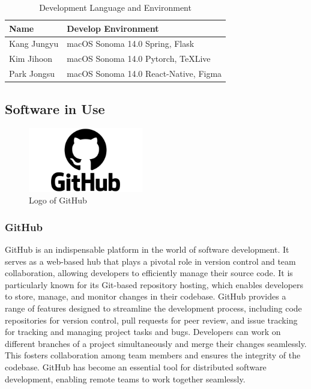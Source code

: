 \documentclass[conference]{IEEEtran}
\begin{document}
    \begin{table}[htbp]
        \caption{Development Language and Environment}
        \centering
        \begin{xtabular}{|p{2cm}|p{4cm}|}
        \hline
        Name & Develop Environment\\
        \hline
        Kang Jungyu & 
        macOS Sonoma 14.0 \hfill \break Spring, Flask\\
        \hline
        Kim Jihoon & 
        macOS Sonoma 14.0 \hfill \break Pytorch, TeXLive\\
        \hline
        Park Jongsu & 
        macOS Sonoma 14.0 \hfill \break React-Native, Figma\\
        \hline
        \end{xtabular}
    \end{table}

    \newpage
    \subsection{Software in Use}
    
        \begin{figure}[htbp]
        \centerline{\includegraphics[width=5cm]{Images/logo/github.png}}
        \label{fig}
        \caption{Logo of GitHub}
        \end{figure}
        \subsubsection{GitHub}
        GitHub is an indispensable platform in the world of software development. It serves as a web-based hub that plays a pivotal role in version control and team collaboration, allowing developers to efficiently manage their source code. It is particularly known for its Git-based repository hosting, which enables developers to store, manage, and monitor changes in their codebase. GitHub provides a range of features designed to streamline the development process, including code repositories for version control, pull requests for peer review, and issue tracking for tracking and managing project tasks and bugs. Developers can work on different branches of a project simultaneously and merge their changes seamlessly. This fosters collaboration among team members and ensures the integrity of the codebase. GitHub has become an essential tool for distributed software development, enabling remote teams to work together seamlessly.\\
        
\end{document}
